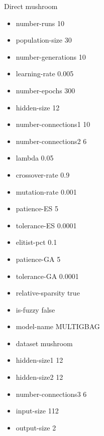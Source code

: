 Direct
mushroom
\begin{itemize}
\item number-runs 10
\item population-size 30
\item number-generations 10
\item learning-rate 0.005
\item number-epochs 300
\item hidden-size 12
\item number-connections1 10
\item number-connections2 6
\item lambda 0.05
\item crossover-rate 0.9
\item mutation-rate 0.001
\item patience-ES 5
\item tolerance-ES 0.0001
\item elitist-pct 0.1
\item patience-GA 5
\item tolerance-GA 0.0001
\item relative-sparsity true
\item is-fuzzy false
\item model-name MULTIGBAG
\item dataset mushroom
\item hidden-size1 12
\item hidden-size2 12
\item number-connections3 6
\item input-size 112
\item output-size 2
\end{itemize}

